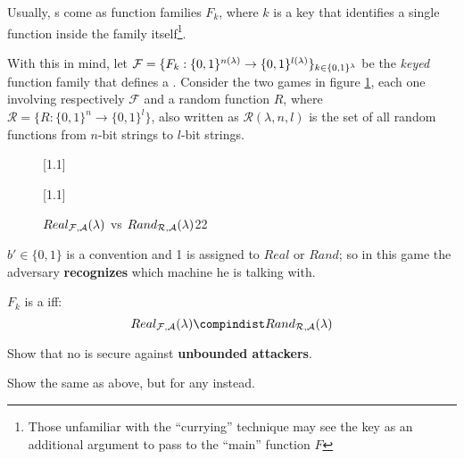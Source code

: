 Usually, \prf{}s come as function families $F_k$, where $k$ is a key that identifies a single function inside the family itself\footnote{Those unfamiliar with the ``currying'' technique may see the key as an additional argument to pass to the ``main'' function $F$}.

With this in mind, let $\mathcal{F}=\{ F_{k}:\{0,1\}^{n(\lambda)} \to \{0,1\}^{l(\lambda)} \}_{k \in \{0,1\}^{\lambda}}$ be the \emph{keyed} function family that defines a \prf. Consider the two games in figure \ref{fig:prftwins}, each one involving respectively $\mathcal{F}$ and a random function $R$, where $\mathcal{R}=\{R : \{0, 1\}^{n} \to \{0, 1\}^{l}\}$, also written as $\mathcal{R}(\lambda, n, l)$ is the set of all random functions from $n$-bit strings to $l$-bit strings.

\begin{figure}[h]
    \centering
    \begin{cryptogame}{}{}{}[1.1]
    \end{cryptogame}
    \begin{cryptogame}{}{}{}[1.1]
    \end{cryptogame}
    
    \caption{$Real_{\mathcal{F}, \mathcal{A}}(\lambda)$ vs $Rand_{\mathcal{R}, \mathcal{A}}(\lambda)$22}
    \label{fig:prftwins}
\end{figure}

$b' \in \{0,1\}$ is a convention and 1 is assigned to $Real$ or $Rand$; so in this game the adversary \textbf{recognizes} which machine he is talking with.

\begin{definition}
    $F_k$ is a \prf{} iff: 
    \[
        Real_{\F, \A}(\lambda) \compindist Rand_{\R, \A}(\lambda)
    \]
\end{definition}

\begin{exercise}
    Show that no \prg{} is secure against \textbf{unbounded attackers}.
\end{exercise}

\begin{exercise}
    Show the same as above, but for any \prf{} instead.
\end{exercise}

